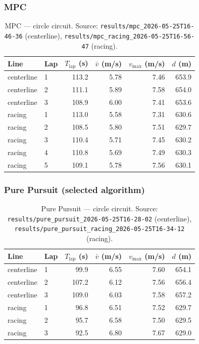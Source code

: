 \documentclass[11pt,a4paper]{article}
\newcommand{\runref}[1]{\texttt{results/#1}}
\begin{document}
\subsubsection{MPC}
\begin{table}[H]
  \centering
  \caption{MPC --- circle circuit.
           Source: \runref{mpc\_2026-05-25T16-46-36} (centerline),
           \runref{mpc\_racing\_2026-05-25T16-56-47} (racing).}
  \label{tab:mpc-laps}
  \small
  \begin{tabular}{@{}llrrrr@{}}
    \toprule
    Line & Lap & $T_{\mathrm{lap}}$ (s) & $\bar{v}$ (m/s) & $v_{\max}$ (m/s) & $d$ (m) \\
    \midrule
    centerline & 1 & 113.2 & 5.78 & 7.46 & 653.9 \\
    centerline & 2 & 111.1 & 5.89 & 7.58 & 654.0 \\
    centerline & 3 & 108.9 & 6.00 & 7.41 & 653.6 \\
    \addlinespace
    racing     & 1 & 113.0 & 5.58 & 7.31 & 630.6 \\
    racing     & 2 & 108.5 & 5.80 & 7.51 & 629.7 \\
    racing     & 3 & 110.4 & 5.71 & 7.45 & 630.2 \\
    racing     & 4 & 110.8 & 5.69 & 7.49 & 630.3 \\
    racing     & 5 & 109.1 & 5.78 & 7.56 & 630.1 \\
    \bottomrule
  \end{tabular}
\end{table}

\subsubsection{Pure Pursuit (selected algorithm)}
\begin{table}[H]
  \centering
  \caption{Pure Pursuit --- circle circuit.
           Source: \runref{pure\_pursuit\_2026-05-25T16-28-02} (centerline),
           \runref{pure\_pursuit\_racing\_2026-05-25T16-34-12} (racing).}
  \label{tab:pp-laps}
  \small
  \begin{tabular}{@{}llrrrr@{}}
    \toprule
    Line & Lap & $T_{\mathrm{lap}}$ (s) & $\bar{v}$ (m/s) & $v_{\max}$ (m/s) & $d$ (m) \\
    \midrule
    centerline & 1 & 99.9  & 6.55 & 7.60 & 654.1 \\
    centerline & 2 & 107.2 & 6.12 & 7.56 & 656.4 \\
    centerline & 3 & 109.0 & 6.03 & 7.58 & 657.2 \\
    \addlinespace
    racing     & 1 & 96.8  & 6.51 & 7.52 & 629.7 \\
    racing     & 2 & 95.7  & 6.58 & 7.50 & 629.5 \\
    racing     & 3 & 92.5  & 6.80 & 7.67 & 629.0 \\
    \bottomrule
  \end{tabular}
\end{table}
\end{document}
